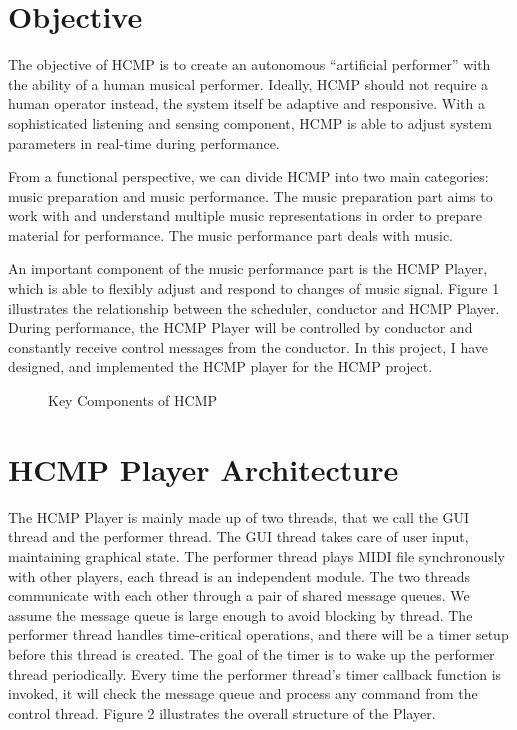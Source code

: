 \section{Objective}
The objective of HCMP \cite{Dawen:2011} is to create an autonomous 
``artificial performer'' with the ability of a human musical performer. 
Ideally, HCMP should not require a human operator instead, the system itself 
be adaptive and responsive. With a sophisticated listening and sensing
component, HCMP is able to adjust system parameters in real-time during 
performance. 

From a functional perspective, we can divide HCMP into two main
categories: music preparation and music performance. The music preparation
part aims to work with and understand multiple music representations in order
to prepare material for performance. The music
performance part deals with music.     

An important component of the music performance part is the HCMP Player, 
which is able to flexibly  
adjust and respond to changes of music signal. Figure 1 illustrates the relationship 
between the scheduler, conductor and HCMP Player. During performance, the HCMP Player will 
be controlled by conductor and constantly receive control messages 
from the conductor. In this project, I have designed, and implemented the HCMP player 
for the HCMP project.
\begin{figure}[H] %
\caption{Key Components of HCMP \cite{Dawen:2011}}
\end{figure}
 

\section{HCMP Player Architecture}
The HCMP Player is mainly made up of two threads, that we call the GUI thread 
and the performer thread. The GUI thread takes care of user input, maintaining 
graphical state. The performer thread plays MIDI file synchronously with other 
players, each thread is an independent 
module. The two threads communicate with each other through a pair of shared 
message queues. We assume the message 
queue is large enough to avoid blocking by thread. The performer thread
handles time-critical operations, and there will be a timer setup 
before this thread is created. The goal of the timer is to 
wake up the performer thread periodically. Every time the performer 
thread's timer callback function is invoked, 
it will check the message queue and process any command from the control thread.
Figure 2 illustrates the overall structure of the Player.

